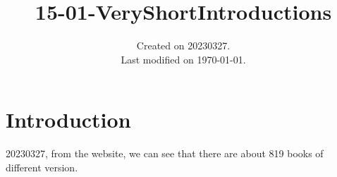 \documentclass[UTF8]{../../RepresentationUniverse}
\begin{document}
\title{15-01-VeryShortIntroductions}
\date{Created on 20230327.\\   Last modified on \today.}
\maketitle
\tableofcontents


\chapter{Introduction}

20230327, from the website, we can see that there are about 819 books of different version.
\end{document}
